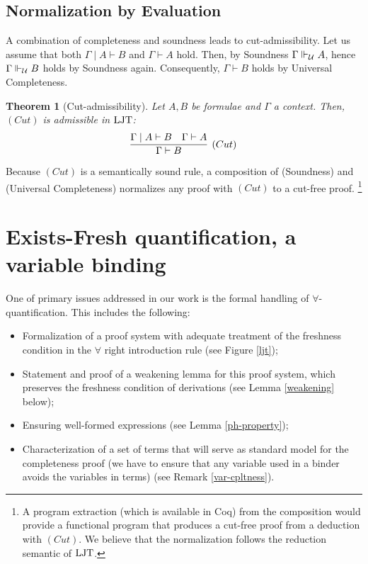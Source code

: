 \documentclass{svjour3}                     %
\newtheorem{thm}{Theorem}%
\newcommand{\calu}{{\cal U}}
\newcommand{\Ga}{\Gamma}
\newcommand{\vd}{\vdash}
\newcommand{\Vd}{\Vdash}
\newcommand{\ljt}{\textup{LJT}}
\begin{document}
\subsection{Normalization by Evaluation}
A combination of completeness and soundness leads to cut-admissibility. Let us assume that both $\Ga \mid A \vd B$ and $\Ga \vd A$ hold. Then, by Soundness $\Ga \Vd_\calu A$, hence $\Ga \Vd_\calu B$ holds by Soundness again. Consequently, $\Ga \vd B$ holds by Universal Completeness.

\begin{thm}[Cut-admissibility]
  Let $A, B$ be formulae and $\Ga$ a context. Then, $(Cut)$ is admissible in $\ljt$:
  \begin{equation*}
    \vcenter{\infer[(Cut)]{\Ga \vd B}{\Ga \mid A \vd B & \Ga \vd A}}
  \end{equation*}
\end{thm}


Because $(Cut)$ is a semantically sound rule, a composition of (Soundness) and (Universal Completeness) normalizes any proof with $(Cut)$ to a cut-free proof. \footnote{A program extraction (which is available in Coq) from the composition would provide a functional program that produces a cut-free proof from a deduction with $(Cut)$. We believe that the normalization follows the reduction semantic of $\ljt$.}

\section{Exists-Fresh quantification, a variable binding}\label{three}
One of primary issues addressed in our work is the formal handling
 of $\forall$-quantification. This includes the following:
\begin{itemize}
\item Formalization of a proof system with adequate treatment of the freshness condition in the $\forall$ right introduction rule (see Figure \ref{ljt});

\item Statement and proof of a weakening lemma for this proof system, which preserves the freshness condition of derivations (see Lemma \ref{weakening} below);

\item Ensuring  well-formed expressions (see Lemma \ref{ph-property}); 


\item Characterization of a set of terms that will serve as standard model for the completeness proof (we have to ensure that any variable used in a binder avoids the variables in terms) (see Remark \ref{var-cpltness}).
\end{itemize}
\end{document}
